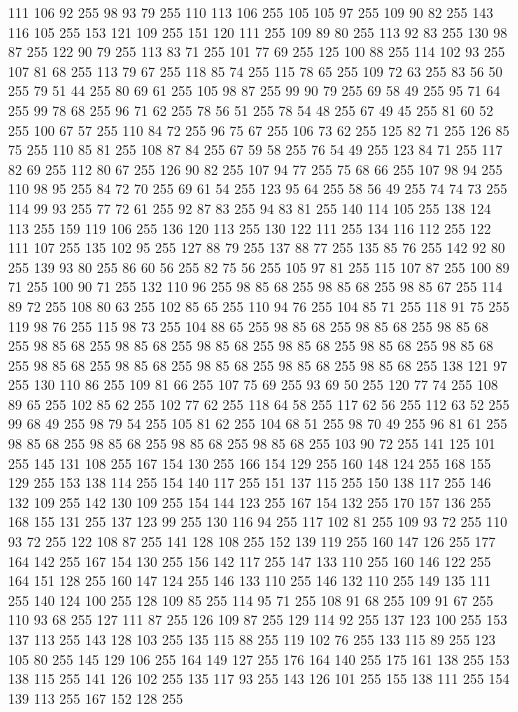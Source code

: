 111 106 92 255 98 93 79 255 110 113 106 255 105 105 97 255 109 90 82 255 143 116 105 255 153 121 109 255 151 120 111 255 109 89 80 255 113 92 83 255 130 98 87 255 122 90 79 255 113 83 71 255 101 77 69 255 125 100 88 255 114 102 93 255 107 81 68 255 113 79 67 255 118 85 74 255 115 78 65 255 109 72 63 255 83 56 50 255 79 51 44 255 80 69 61 255 105 98 87 255 99 90 79 255 69 58 49 255 95 71 64 255 99 78 68 255 96 71 62 255 78 56 51 255 78 54 48 255 67 49 45 255 81 60 52 255 100 67 57 255 110 84 72 255 96 75 67 255 106 73 62 255 125 82 71 255 126 85 75 255 110 85 81 255 108 87 84 255 67 59 58 255 76 54 49 255 123 84 71 255 117 82 69 255 112 80 67 255 126 90 82 255 107 94 77 255 75 68 66 255 107 98 94 255 110 98 95 255 84 72 70 255 69 61 54 255 123 95 64 255 58 56 49 255 74 74 73 255 114 99 93 255 77 72 61 255 92 87 83 255 94 83 81 255 140 114 105 255 138 124 113 255 159 119 106 255
136 120 113 255 130 122 111 255 134 116 112 255 122 111 107 255 135 102 95 255 127 88 79 255 137 88 77 255 135 85 76 255 142 92 80 255 139 93 80 255 86 60 56 255 82 75 56 255 105 97 81 255 115 107 87 255 100 89 71 255 100 90 71 255 132 110 96 255 98 85 68 255 98 85 68 255 98 85 67 255 114 89 72 255 108 80 63 255 102 85 65 255 110 94 76 255 104 85 71 255 118 91 75 255 119 98 76 255 115 98 73 255 104 88 65 255 98 85 68 255 98 85 68 255 98 85 68 255 98 85 68 255 98 85 68 255 98 85 68 255 98 85 68 255 98 85 68 255 98 85 68 255 98 85 68 255 98 85 68 255 98 85 68 255 98 85 68 255 98 85 68 255 138 121 97 255 130 110 86 255 109 81 66 255 107 75 69 255 93 69 50 255 120 77 74 255 108 89 65 255 102 85 62 255 102 77 62 255 118 64 58 255 117 62 56 255 112 63 52 255 99 68 49 255 98 79 54 255 105 81 62 255 104 68 51 255 98 70 49 255 96 81 61 255 98 85 68 255 98 85 68 255 98 85 68 255
98 85 68 255 103 90 72 255 141 125 101 255 145 131 108 255 167 154 130 255 166 154 129 255 160 148 124 255 168 155 129 255 153 138 114 255 154 140 117 255 151 137 115 255 150 138 117 255 146 132 109 255 142 130 109 255 154 144 123 255 167 154 132 255 170 157 136 255 168 155 131 255 137 123 99 255 130 116 94 255 117 102 81 255 109 93 72 255 110 93 72 255 122 108 87 255 141 128 108 255 152 139 119 255 160 147 126 255 177 164 142 255 167 154 130 255 156 142 117 255 147 133 110 255 160 146 122 255 164 151 128 255 160 147 124 255 146 133 110 255 146 132 110 255 149 135 111 255 140 124 100 255 128 109 85 255 114 95 71 255 108 91 68 255 109 91 67 255 110 93 68 255 127 111 87 255 126 109 87 255 129 114 92 255 137 123 100 255 153 137 113 255 143 128 103 255 135 115 88 255 119 102 76 255 133 115 89 255 123 105 80 255 145 129 106 255 164 149 127 255 176 164 140 255 175 161 138 255 153 138 115 255 141 126 102 255 135 117 93 255 143 126 101 255 155 138 111 255 154 139 113 255 167 152 128 255
